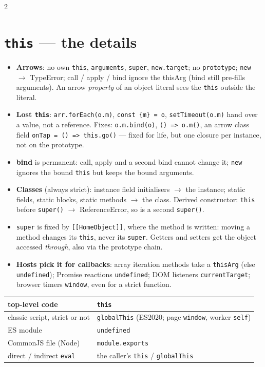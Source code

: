 \documentclass[8pt]{extarticle}
\newcommand\ct[1]{\texttt{#1}}
\newcommand\fat{\hbox{=}\hbox{>}}%
\begin{document}
\begin{multicols}{2}
\section{\texttt{this} — the details}
\begin{itemize}
  \item \textbf{Arrows}: no own \ct{this}, \ct{arguments}, \ct{super}, \ct{new.target}; no
        \ct{prototype}; \ct{new} $\rightarrow$ TypeError; call / apply / bind ignore the
        thisArg (bind still pre-fills arguments). An arrow \emph{property} of an object literal
        sees the \ct{this} outside the literal.
  \item \textbf{Lost \ct{this}}: \ct{arr.forEach(o.m)}, \ct{const \{m\} = o},
        \ct{setTimeout(o.m)} hand over a value, not a reference. Fixes: \ct{o.m.bind(o)},
        \ct{() \fat{} o.m()}, an arrow class field \ct{onTap = () \fat{} this.go()} — fixed for life,
        but one closure per instance, not on the prototype.
  \item \textbf{bind} is permanent: call, apply and a second bind cannot change it; \ct{new}
        ignores the bound \ct{this} but keeps the bound arguments.
  \item \textbf{Classes} (always strict): instance field initialisers $\rightarrow$ the
        instance; static fields, static blocks, static methods $\rightarrow$ the class. Derived
        constructor: \ct{this} before \ct{super()} $\rightarrow$ ReferenceError, so is a second
        \ct{super()}.
  \item \ct{super} is fixed by \ct{[[HomeObject]]}, where the method is written: moving a
        method changes its \ct{this}, never its \ct{super}. Getters and setters get the object
        accessed \emph{through}, also via the prototype chain.
  \item \textbf{Hosts pick it for callbacks}: array iteration methods take a \ct{thisArg}
        (else \ct{undefined}); Promise reactions \ct{undefined}; DOM listeners
        \ct{currentTarget}; browser timers \ct{window}, even for a strict function.
\end{itemize}
{\scriptsize\setlength{\tabcolsep}{2.5pt}
\begin{tabular}{@{}>{\raggedright}p{31mm}>{\raggedright\arraybackslash}p{44mm}@{}}
\toprule
\textbf{top-level code} & \textbf{\ct{this}} \\ \midrule
classic script, strict or not & \ct{globalThis} (ES2020; page \ct{window}, worker \ct{self}) \\
ES module & \ct{undefined} \\
CommonJS file (Node) & \ct{module.exports} \\
direct / indirect \ct{eval} & the caller's \ct{this} / \ct{globalThis} \\ \bottomrule
\end{tabular}}


\end{multicols}
\end{document}
